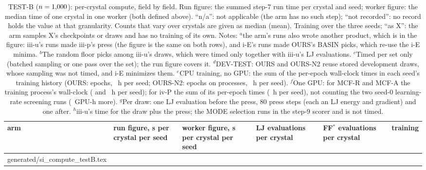 \documentclass[journal=acsodf,manuscript=article]{achemso}
\makeatletter
\newcommand{\inputrows}[1]{\@@input #1 }
\makeatother
\begin{document}
\begin{table}[htbp]
\caption{TEST-B ($n=1{,}000$): per-crystal compute, field by field. Run figure: the summed
step-7 run time per crystal and seed; worker figure: the median time of one crystal in one
worker (both defined above). ``n/a'': not applicable (the arm has no such step); ``not
recorded'': no record holds the value at that granularity. Counts that vary over crystals are
given as median (mean). Training over the three seeds; ``as X'': the arm samples X's
checkpoints or draws and has no training of its own. Notes: $^{a}$the arm's runs also wrote
another product, which is in the figure: iii-u's runs made iii-p's press (the figure is the
same on both rows), and i-E's runs made OURS's BASIN picks, which re-use the i-E minima.
$^{b}$The random floor picks among iii-u's draws, which were timed only together with iii-u's LJ
evaluations. $^{c}$Timed per set only (batched sampling or one pass over the set); the run
figure covers it. $^{d}$DEV-TEST: OURS and OURS-N2 reuse stored development draws, whose
sampling was not timed, and i-E minimizes them. $^{e}$CPU training, no GPU: the sum of the
per-epoch wall-clock times in each seed's training history (OURS: \svOursEpochs{} epochs,
\svTrainOursSeed~h per seed; OURS-N2: \svOursNTwoEpochs{} epochs on \svTrainNTwoProcs{}
processes, \svTrainNTwoSeed~h per seed). $^{f}$One GPU: for MCF-R and MCF-A the training
process's wall-clock (\svTrainMcfRSeed{} and \svTrainMcfASeed~h per seed); for iv-P the sum of
its per-epoch times (\svTrainIvPSeed~h per seed), not counting the two seed-0 learning-rate
screening runs (\svTrainIvPScreen~GPU-h more). $^{g}$Per draw: one LJ evaluation before the
press, 80 press steps (each an LJ energy and gradient) and one after. $^{h}$iii-u's time for the
draw plus the press; the MODE selection runs in the step-9 scorer and is not timed.}
\label{tab:si_compute}
\centering
\scriptsize
\setlength{\tabcolsep}{4pt}
\begin{tabular}{@{}l>{\centering}p{1.8cm}>{\centering}p{1.8cm}>{\centering}p{2.3cm}>{\centering}p{2.2cm}>{\centering\arraybackslash}p{2.2cm}@{}}
\toprule
arm & run figure, s per crystal per seed & worker figure, s per crystal per seed & LJ evaluations per crystal & FF$^\ast$ evaluations per crystal & training \\
\midrule
\inputrows{generated/si_compute_testB.tex}
\bottomrule
\end{tabular}
\end{table}
\end{document}
